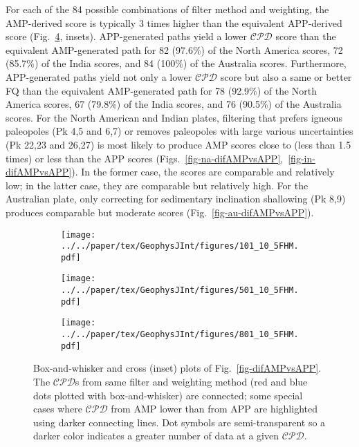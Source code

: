 For each of the 84 possible combinations of filter method and weighting, the
AMP-derived score is typically 3 times higher than the equivalent
APP-derived score (Fig.~\ref{fig-boxAMPvsAPP}, insets). APP-generated paths
yield a lower $\mathcal{CPD}$ score than the equivalent AMP-generated path for
82 (97.6\%) of the North America scores, 72 (85.7\%) of the India scores, and 84
(100\%) of the Australia scores. Furthermore, APP-generated paths yield not only
a lower $\mathcal{CPD}$ score but also a same or better FQ than the equivalent
AMP-generated path for 78 (92.9\%) of the North America scores, 67 (79.8\%) of
the India scores, and 76 (90.5\%) of the Australia scores. For the North
American and Indian plates, filtering that prefers igneous paleopoles (Pk 4,5
and 6,7) or removes paleopoles with large various uncertainties (Pk 22,23 and
26,27) is most likely to produce AMP scores close to (less than 1.5 times) or
less than the APP scores
(Figs.~\ref{fig-na-difAMPvsAPP},~\ref{fig-in-difAMPvsAPP}). In the former case,
the scores are comparable and relatively low; in the latter case, they are
comparable but relatively high. For the Australian plate, only correcting for
sedimentary inclination shallowing (Pk 8,9) produces comparable but moderate
scores (Fig.~\ref{fig-au-difAMPvsAPP}).

\begin{figure}
  \centering
  \begin{subfigure}{1\textwidth}
    \texttt{[image: ../../paper/tex/GeophysJInt/figures/101\_10\_5FHM.pdf]}
    \caption{}\label{fig-na-boxAMPvsAPP}
  \end{subfigure}
  \vspace{.1em}
  \begin{subfigure}{1\textwidth}
    \texttt{[image: ../../paper/tex/GeophysJInt/figures/501\_10\_5FHM.pdf]}
    \caption{}\label{fig-in-boxAMPvsAPP}
  \end{subfigure}
  \vspace{.1em}
  \begin{subfigure}{1\textwidth}
    \texttt{[image: ../../paper/tex/GeophysJInt/figures/801\_10\_5FHM.pdf]}
    \caption{}\label{fig-au-boxAMPvsAPP}
  \end{subfigure}
  \caption[]{Box-and-whisker and cross (inset) plots of
Fig.~\ref{fig-difAMPvsAPP}. The $\mathcal{CPD}$s from same filter and weighting
method (red and blue dots plotted with box-and-whisker) are connected; some
special cases where $\mathcal{CPD}$ from AMP lower than from APP are highlighted
using darker connecting lines. Dot symbols are semi-transparent so a darker
color indicates a greater number of data at a given
$\mathcal{CPD}$.}\label{fig-boxAMPvsAPP}
\end{figure}

